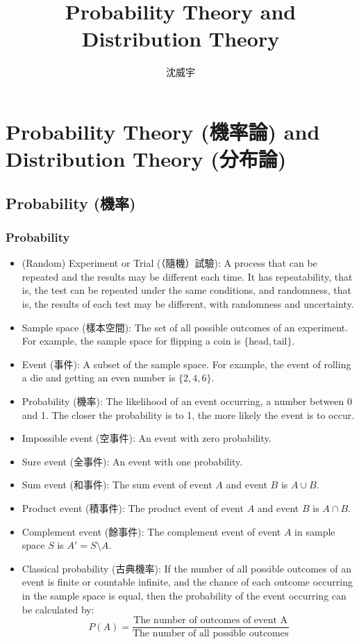 \documentclass[a4paper,12pt]{report}
\begin{document}
\title{Probability Theory and Distribution Theory}
\author{沈威宇}
\date{\temtoday}
\titletocdoc
\chapter{Probability Theory (機率論) and Distribution Theory (分布論)}
\section{Probability (機率)}
\subsection{Probability}
\begin{itemize}
\item (Random) Experiment or Trial (（隨機）試驗): A process that can be repeated and the results may be different each time. It has repeatability, that is, the test can be repeated under the same conditions, and randomness, that is, the results of each test may be different, with randomness and uncertainty.
\item Sample space (樣本空間): The set of all possible outcomes of an experiment. For example, the sample space for flipping a coin is $\{\text{head}, \text{tail}\}$.
\item Event (事件): A subset of the sample space. For example, the event of rolling a die and getting an even number is $\{2, 4, 6\}$.
\item Probability (機率): The likelihood of an event occurring, a number between 0 and 1. The closer the probability is to 1, the more likely the event is to occur.
\item Impossible event (空事件): An event with zero probability.
\item Sure event (全事件): An event with one probability.
\item Sum event (和事件): The sum event of event $A$ and event $B$ is $A\cup B$.
\item Product event (積事件): The product event of event $A$ and event $B$ is $A\cap B$.
\item Complement event (餘事件): The complement event of event $A$ in sample space $S$ is $A'=S\setminus A$.
\item Classical probability (古典機率): If the number of all possible outcomes of an event is finite or countable infinite, and the chance of each outcome occurring in the sample space is equal, then the probability of the event occurring can be calculated by:
\[ P(A)= \frac{\text{The number of outcomes of event A}}{\text{The number of all possible outcomes}} \]

\end{itemize}
\end{document}
